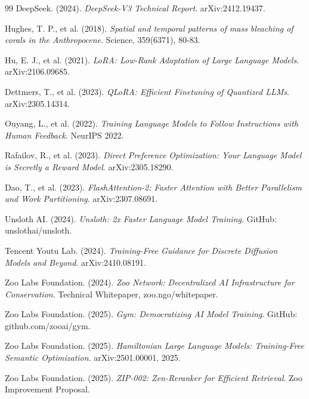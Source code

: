 \begin{thebibliography}{99}
DeepSeek. (2024).
\textit{DeepSeek-V3 Technical Report}.
arXiv:2412.19437.

Hughes, T. P., et al. (2018).
\textit{Spatial and temporal patterns of mass bleaching of corals in the Anthropocene}.
Science, 359(6371), 80-83.

Hu, E. J., et al. (2021).
\textit{LoRA: Low-Rank Adaptation of Large Language Models}.
arXiv:2106.09685.

Dettmers, T., et al. (2023).
\textit{QLoRA: Efficient Finetuning of Quantized LLMs}.
arXiv:2305.14314.

Ouyang, L., et al. (2022).
\textit{Training Language Models to Follow Instructions with Human Feedback}.
NeurIPS 2022.

Rafailov, R., et al. (2023).
\textit{Direct Preference Optimization: Your Language Model is Secretly a Reward Model}.
arXiv:2305.18290.

Dao, T., et al. (2023).
\textit{FlashAttention-2: Faster Attention with Better Parallelism and Work Partitioning}.
arXiv:2307.08691.

Unsloth AI. (2024).
\textit{Unsloth: 2x Faster Language Model Training}.
GitHub: unslothai/unsloth.

Tencent Youtu Lab. (2024).
\textit{Training-Free Guidance for Discrete Diffusion Models and Beyond}.
arXiv:2410.08191.

Zoo Labs Foundation. (2024).
\textit{Zoo Network: Decentralized AI Infrastructure for Conservation}.
Technical Whitepaper, zoo.ngo/whitepaper.

Zoo Labs Foundation. (2025).
\textit{Gym: Democratizing AI Model Training}.
GitHub: github.com/zooai/gym.

Zoo Labs Foundation. (2025).
\textit{Hamiltonian Large Language Models: Training-Free Semantic Optimization}.
arXiv:2501.00001, 2025.

Zoo Labs Foundation. (2025).
\textit{ZIP-002: Zen-Reranker for Efficient Retrieval}.
Zoo Improvement Proposal.

\end{thebibliography}

